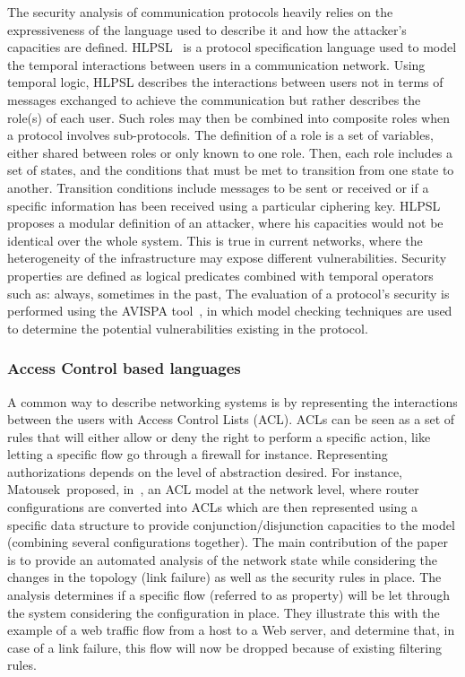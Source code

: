 The security analysis of communication protocols heavily relies on the expressiveness of the language used to describe it and how the attacker's capacities are defined. HLPSL~\cite{HLPSL-Chevalier2004} is a protocol specification language used to model the temporal interactions between users in a communication network. Using temporal logic, HLPSL describes the interactions between users not in terms of messages exchanged to achieve the communication but rather describes the role(s) of each user. Such roles may then be combined into composite roles when a protocol involves sub-protocols.
The definition of a role is a set of variables, either shared between roles or only known to one role.
Then, each role includes a set of states, and the conditions that must be met to transition from one state to another. Transition conditions include messages to be sent or received or if a specific information has been received using a particular ciphering key.
HLPSL proposes a modular definition of an attacker, where his capacities would not be identical over the whole system.
This is true in current networks, where the heterogeneity of the infrastructure may expose different vulnerabilities.
Security properties are defined as logical predicates combined with temporal operators such as: always, sometimes in the past, \etc
The evaluation of a protocol's security is performed using the AVISPA tool~\cite{avispa}, in which model checking techniques are used to determine the potential vulnerabilities existing in the protocol.

\subsubsection{Access Control based languages}
A common way to describe networking systems is by representing the interactions between the users with Access Control Lists (ACL).
ACLs can be seen as a set of rules that will either allow or deny the right to perform a specific action, like letting a specific flow go through a firewall for instance.
Representing authorizations depends on the level of abstraction desired.
For instance, Matousek~\etal proposed, in~\cite{Matousek2008}, an ACL model at the network level, where router configurations are converted into ACLs which are then represented using a specific data structure to provide conjunction/disjunction capacities to the model (\ie combining several configurations together).
The main contribution of the paper is to provide an automated analysis of the network state while considering the changes in the topology (\ie link failure) as well as the security rules in place.
The analysis determines if a specific flow (referred to as property) will be let through the system considering the configuration in place. They illustrate this with the example of a web traffic flow from a host to a Web server, and determine that, in case of a link failure, this flow will now be dropped because of existing filtering rules.

